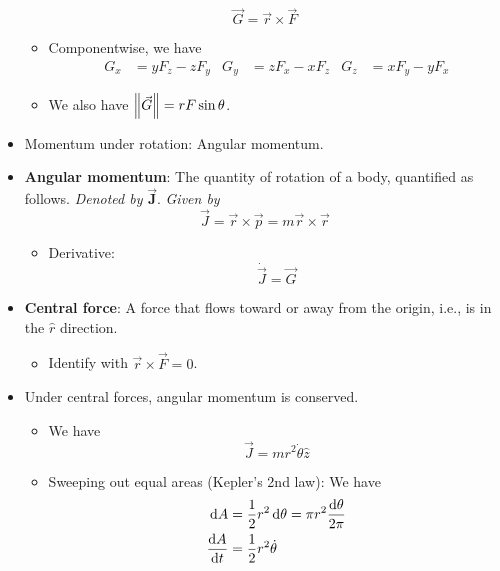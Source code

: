 \documentclass[../notes.tex]{subfiles}
\begin{document}
\begin{itemize}
    \begin{equation*}
        \vec{G} = \vec{r}\times\vec{F}
    \end{equation*}
    \begin{itemize}
        \item Componentwise, we have
        \begin{align*}
            G_x &= yF_z-zF_y&
            G_y &= zF_x-xF_z&
            G_z &= xF_y-yF_x
        \end{align*}
        \item We also have $\norm{\vec{G}}=rF\sin\theta$.
    \end{itemize}
    \item Momentum under rotation: Angular momentum.
    \item \textbf{Angular momentum}: The quantity of rotation of a body, quantified as follows. \emph{Denoted by} $\bm{\vec{J}}$. \emph{Given by}
    \begin{equation*}
        \vec{J} = \vec{r}\times\vec{p}
        = m\vec{r}\times\vec{r}
    \end{equation*}
    \begin{itemize}
        \item Derivative:
        \begin{equation*}
            \dot{\vec{J}} = \vec{G}
        \end{equation*}
    \end{itemize}
    \item \textbf{Central force}: A force that flows toward or away from the origin, i.e., is in the $\hat{r}$ direction.
    \begin{itemize}
        \item Identify with $\vec{r}\times\vec{F}=0$.
    \end{itemize}
    \item Under central forces, angular momentum is conserved.
    \begin{itemize}
        \item We have
        \begin{equation*}
            \vec{J} = mr^2\dot{\theta}\hat{z}
        \end{equation*}
        \item Sweeping out equal areas (Kepler's 2nd law): We have
        \begin{align*}
            \dd{A} &= \frac{1}{2}r^2\dd{\theta} = \pi r^2\frac{\dd{\theta}}{2\pi}\\
            \dv{A}{t} &= \frac{1}{2}r^2\dot{\theta}
        \end{align*}
    \end{itemize}
\end{itemize}
\end{document}
